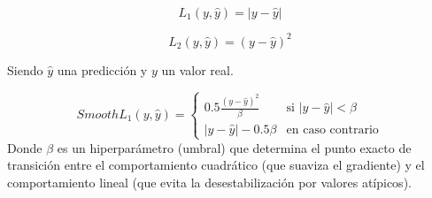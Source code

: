 \begin{equation}
\label{eq:L1}
L_1(y, \hat{y}) = |y - \hat{y}|
\end{equation}

\begin{equation}
\label{eq:L2}
L_2(y, \hat{y}) = (y - \hat{y})^2
\end{equation}

Siendo $\hat{y}$ una predicción y $y$ un valor real.

\begin{equation}
\label{eq:smoothL1}
SmoothL_1(y, \hat{y}) = 
\begin{cases} 
0.5 \frac{(y - \hat{y})^2}{\beta} & \text{si } |y - \hat{y}| < \beta \\ 
|y - \hat{y}| - 0.5 \beta & \text{en caso contrario} 
\end{cases}
\end{equation}
Donde $\beta$ es un hiperparámetro (umbral) que determina el punto exacto de transición entre el comportamiento cuadrático (que suaviza el gradiente) y el comportamiento lineal (que evita la desestabilización por valores atípicos). 

